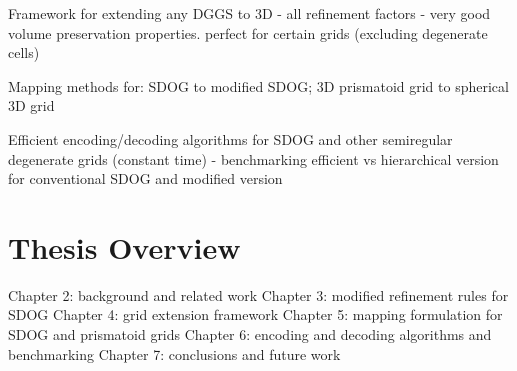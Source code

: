 Framework for extending any DGGS to 3D
	- all refinement factors
	- very good volume preservation properties. perfect for certain grids (excluding degenerate cells)

Mapping methods for: SDOG to modified SDOG; 3D prismatoid grid to spherical 3D grid

Efficient encoding/decoding algorithms for SDOG and other semiregular degenerate grids (constant time)
 	- benchmarking efficient vs hierarchical version for conventional SDOG and modified version

\section{Thesis Overview}

Chapter 2: background and related work
Chapter 3: modified refinement rules for SDOG
Chapter 4: grid extension framework
Chapter 5: mapping formulation for SDOG and prismatoid grids
Chapter 6: encoding and decoding algorithms and benchmarking
Chapter 7: conclusions and future work


